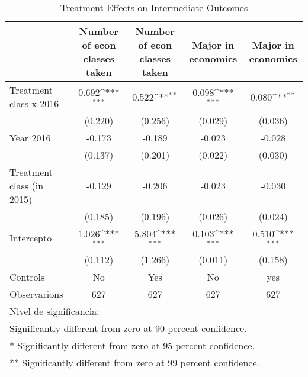 \begin{table}[]
\caption{Treatment Effects on Intermediate Outcomes}
{
\def\sym#1{\ifmmode^{#1}\else\(^{#1}\)\fi}
\begin{tabular}{@{\extracolsep{2pt}}l*{4}{c}@{}}
\hline\hline


 & Number of econ classes taken & Number of econ classes taken & Major in economics & Major in economics \\
\hline
Treatment class x 2016 & 0.692\sym{***} & 0.522\sym{**} & 0.098\sym{***} & 0.080\sym{**} \\
 & (0.220) & (0.256) & (0.029) & (0.036) \\
Year 2016 & -0.173 & -0.189 & -0.023 & -0.028 \\
 & (0.137) & (0.201) & (0.022) & (0.030) \\
Treatment class (in 2015) & -0.129 & -0.206 & -0.023 & -0.030 \\
 & (0.185) & (0.196) & (0.026) & (0.024) \\
Intercepto & 1.026\sym{***} & 5.804\sym{***} & 0.103\sym{***} & 0.510\sym{***} \\
 & (0.112) & (1.266) & (0.011) & (0.158) \\
Controls & No & Yes & No & yes \\

\hline
Observarions & 627 & 627 & 627 & 627 \\
\hline\hline
\multicolumn{5}{l}{\footnotesize Nivel de significancia:}\vspace{-.25em} \\
\multicolumn{5}{l}{\footnotesize * Significantly different from zero at 90 percent confidence.}\vspace{-.25em} \\
\multicolumn{5}{l}{\footnotesize ** Significantly different from zero at 95 percent confidence.}\vspace{-.25em} \\
\multicolumn{5}{l}{\footnotesize *** Significantly different from zero at 99 percent confidence.}
\end{tabular}
}
\end{table}